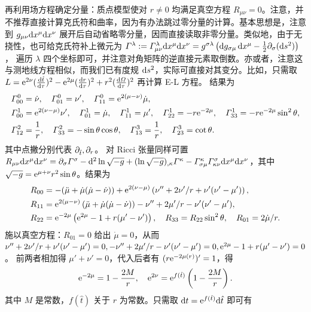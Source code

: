 再利用场方程确定分量：质点模型使对 $r\ne 0$ 均满足真空方程 $R_{\mu\nu}=0$。注意，并不推荐直接计算克氏符和曲率，因为有办法跳过零分量的计算。基本思想是，注意到 $g_{\mu\nu}\dd x^\mu\dd x^\nu$ 展开后自动省略零分量，因而直接读取非零分量。类似地，由于无挠性，也可给克氏符补上微元为
$\Gamma^\lambda:=\Gamma^\lambda_{\mu\nu}\dd x^\mu\dd x^\nu=g^{\sigma\lambda}\left(\dd g_{\sigma\mu}\,\dd x^\mu- \frac{1}{2} \partial_\sigma(\dd s^2)\right)$，
遍历 $\lambda$ 四个坐标即可，并注意对角矩阵的逆直接元素取倒数。亦或者，注意这与测地线方程相似，而我们已有度规 $\dd s^2$，实际可直接对其变分。比如，只需取 $L=\mathrm{e}^{2\nu}(\dv{\hat t}{\tau})^2-\mathrm{e}^{2\mu}(\dv{r}{\tau})^2+r^2(\dv{\Omega}{\tau})^2$ 再计算 E-L 方程。
结果为
\begin{align*}
    & \Gamma_{00}^0=\dot{\nu}, \quad \Gamma_{01}^0=\nu^{\prime}, \quad \Gamma_{11}^0=\mathrm{e}^{2(\mu-\nu)} \dot{\mu}, \\& \Gamma_{00}^1=\mathrm{e}^{2(\nu-\mu)} \nu^{\prime}, \quad \Gamma_{01}^1=\dot{\mu}, \quad \Gamma_{11}^1=\mu^{\prime}, \quad \Gamma_{22}^1=-r \mathrm{e}^{-2 \mu}, \quad \Gamma_{33}^1=-r \mathrm{e}^{-2 \mu} \sin ^2 \theta, \\
    & \Gamma_{12}^2=\frac{1}{r}, \quad \Gamma_{33}^2=-\sin \theta \cos \theta, \quad \Gamma_{13}^3=\frac{1}{r}, \quad \Gamma_{23}^3=\cot \theta.
\end{align*}
其中点撇分别代表 $\partial_{\hat t},\partial_{r}$。
对 Ricci 张量同样可置
$R_{\mu\nu}\dd x^\mu\dd x^\nu=\partial_\sigma\Gamma^\sigma-\dd^2\ln\sqrt{-g}+(\ln\sqrt{-g})_{,\kappa}\Gamma^\kappa-\Gamma^\kappa_{\sigma\mu}\Gamma^\sigma_{\kappa\nu}\dd x^\mu\dd x^\nu$，其中 $\sqrt{-g}=\mathrm{e}^{\mu+\nu}r^2\sin\theta$。结果为
\begin{align*}
    R_{00} &= -(\ddot\mu+\dot\mu(\dot\mu-\dot\nu))+\mathrm{e}^{2(\nu-\mu)} \left(\nu''+2\nu'/r+\nu'(\nu'-\mu')\right), \\
    R_{11} &= \mathrm{e}^{2(\mu-\nu)} \left(\ddot\mu+\dot\mu(\dot\mu-\dot\nu)\right)-\nu''+2\mu'/r-\nu'(\nu'-\mu'), \\
    R_{22} &= \mathrm{e}^{-2\mu} \left(\mathrm{e}^{2\mu}-1+r(\mu'-\nu')\right), \quad R_{33} = R_{22} \sin ^2 \theta,\quad R_{01} = 2\dot\mu/r.
\end{align*}
施以真空方程：$R_{01}=0$ 给出 $\dot\mu=0$，从而
$\nu''+2\nu'/r+\nu'(\nu'-\mu')=0, 
-\nu''+2\mu'/r-\nu'(\nu'-\mu')=0, 
\mathrm{e}^{2\mu}-1+r(\mu'-\nu')=0$。
前两者相加得 $\mu'+\nu'=0$，代入后者有 $(r\mathrm{e}^{-2\mu(r)})'=1$，得
\[\mathrm{e}^{-2\mu}=1-\frac{2M}{r},\quad \mathrm{e}^{2\nu}=\mathrm{e}^{f(\hat t)}\left(1-\frac{2M}{r}\right).\]
其中 $M$ 是常数，$f(\hat t)$ 关于 $r$ 为常数。只需取 $\dd t=\mathrm{e}^{f(\hat t)}\dd\hat t$ 即可有
